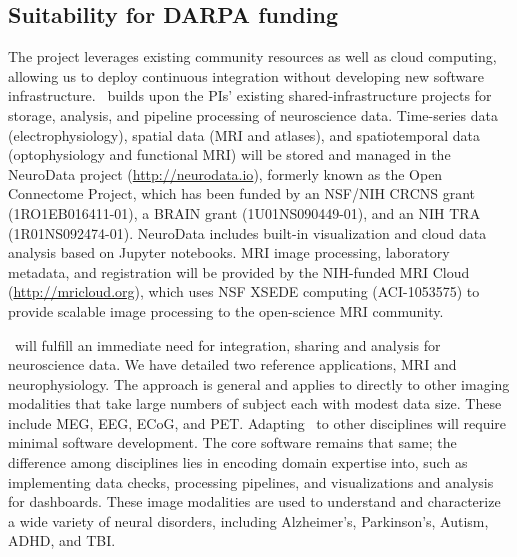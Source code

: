 \subsection{Suitability for DARPA funding}


The project leverages existing community resources as well as cloud computing, allowing us to deploy 
continuous integration without developing new software infrastructure.
\name~builds upon the PIs' existing shared-infrastructure projects for storage, analysis, and 
pipeline processing of neuroscience data.  Time-series data 
(electrophysiology), 
spatial data (MRI and atlases), and spatiotemporal data (optophysiology and functional MRI) will be stored and managed 
in the NeuroData project (\url{http://neurodata.io}), formerly known as the Open Connectome Project, 
which has been funded by an NSF/NIH CRCNS grant (1RO1EB016411-01), a BRAIN grant (1U01NS090449-01), 
and an NIH TRA (1R01NS092474-01).  
NeuroData includes built-in visualization and cloud data analysis based on Jupyter notebooks.  
MRI image processing, laboratory metadata, and registration will be provided by the 
NIH-funded MRI Cloud (\url{http://mricloud.org}), which uses 
NSF XSEDE computing (ACI-1053575) to provide scalable image processing to the open-science MRI community.


\name~will fulfill an immediate need for integration, sharing and analysis for neuroscience data.
We have detailed two reference applications, MRI and neurophysiology.
The approach is general and applies to directly to other imaging modalities that take 
large numbers of subject each with modest data size.  These include MEG, EEG, ECoG, and PET.
Adapting \name~to other disciplines will require minimal software development. 
The core software remains that same; the difference among disciplines lies in encoding
domain expertise into, such as implementing data checks, processing pipelines, and
visualizations and analysis for dashboards.  These image modalities are used to understand 
and characterize a wide variety of neural disorders, including Alzheimer's, Parkinson's,
Autism, ADHD, and TBI.  

